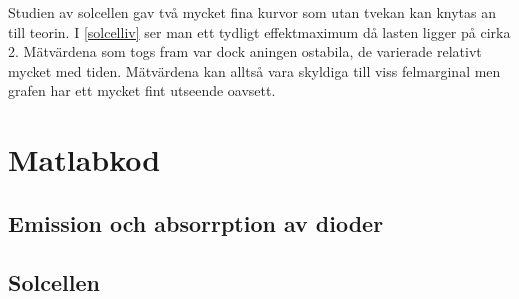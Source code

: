 \documentclass[a4paper]{article}
\begin{document}
Studien av solcellen gav två mycket fina kurvor som utan tvekan kan knytas an till teorin. I \ref{solcelliv} ser man ett tydligt effektmaximum då lasten ligger på cirka 2\Omega. Mätvärdena som togs fram var dock aningen ostabila, de varierade relativt mycket med tiden. Mätvärdena kan alltså vara skyldiga till viss felmarginal men grafen har ett mycket fint utseende oavsett.

\newpage
\appendix
\section{Matlabkod}
\subsection{Emission och absorrption av dioder}

\subsection{Solcellen}


\newpage
\end{document}
